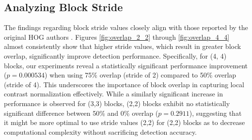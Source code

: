 \subsection{Analyzing Block Stride}

The findings regarding block stride values closely align with those reported by the original HOG authors \cite{dalal_2005_histograms}. Figures \ref{fig:overlap_2_2} through \ref{fig:overlap_4_4} almost consistently show that higher stride values, which result in greater block overlap, significantly improve detection performance. Specifically, for (4, 4) blocks, our experiments reveal a statistically significant performance improvement ($p=0.000534$) when using 75\% overlap (stride of 2) compared to 50\% overlap (stride of 4). This underscores the importance of block overlap in capturing local contrast normalization effectively. While a similarly significant increase in performance is observed for (3,3) blocks, (2,2) blocks exhibit no statistically significant difference between 50\% and 0\% overlap ($p=0.2911$), suggesting that it might be more optimal to use stride values (2,2) for (2,2) blocks as to decrease computational complexity without sacrificing detection accuracy.